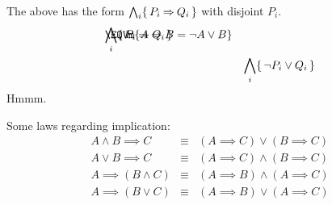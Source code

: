 The above has the form $\bigwedge_i\{\,P_i \mathbin{\Rightarrow} Q_i\,\}$ 
with disjoint $P_i$.
\begin{eqnarray*}
\lefteqn{\bigwedge_i\setof{P_i \implies Q_i}}
\EQVm{A\implies B = \lnot A \lor B}
\\&& \bigwedge_i\setof{\lnot P_i \lor Q_i}
\end{eqnarray*}
Hmmm.

Some laws regarding implication:
\begin{eqnarray*}
    A \land B \implies C   &\equiv& (A \implies C) \lor  (B \implies C)
\\  A \lor  B \implies C   &\equiv& (A \implies C) \land (B \implies C)
\\  A \implies (B \land C) &\equiv& (A \implies B) \land (A \implies C)
\\  A \implies (B \lor C)  &\equiv& (A \implies B) \lor  (A \implies C)
\end{eqnarray*}






